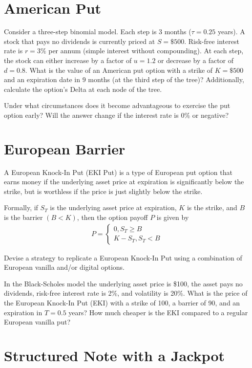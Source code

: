 \documentclass[a4paper,14pt]{extarticle}
\begin{document}
\section{American Put}

Consider a three-step binomial model. Each step is 3 months ($\tau=0.25$ years). A stock that pays no dividends is currently priced at $S=\$500$. Risk-free interest rate is $r=3\%$ per annum (simple interest without compounding). At each step, the stock can either increase by a factor of $u=1.2$ or decrease by a factor of $d=0.8$. What is the value of an American put option with a strike of $K=\$500$ and an expiration date in 9 months (at the third step of the tree)? Additionally, calculate the option's Delta at each node of the tree.

Under what circumstances does it become advantageous to exercise the put option early? Will the answer change if the interest rate is 0\% or negative?


\section{European Barrier}

A European Knock-In Put (EKI Put) is a type of European put option that earns money if the underlying asset price at expiration is significantly below the strike, but is worthless if the price is just slightly below the strike.


Formally, if $S_T$ is the underlying asset price at expiration, $K$ is the strike, and $B$ is the barrier $(B < K)$, then the option payoff $P$ is given by
\begin{align*}
P = \begin{cases}
0, S_T \ge B \\
K - S_T, S_T < B
\end{cases}
\end{align*}

Devise a  strategy to replicate a European Knock-In Put using a combination of European vanilla and/or digital options.

In the Black-Scholes model the underlying asset price is \$100, the asset pays no dividends, risk-free interest rate is 2\%, and volatility is 20\%. What is the price of the European Knock-In Put (EKI) with a strike of 100, a barrier of 90, and an expiration in $T=0.5$ years? How much cheaper is the EKI compared to a regular European vanilla put?

\section{Structured Note with a Jackpot}
\end{document}
